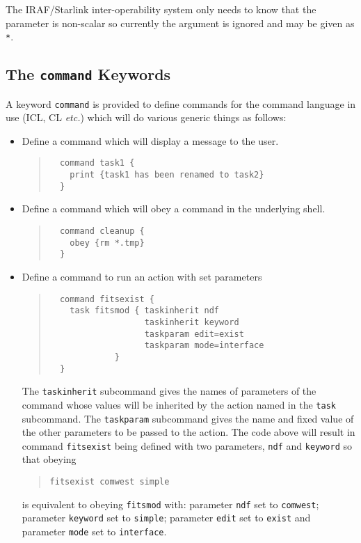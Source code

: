 \documentclass[twoside,11pt]{article}
\newcommand{\htmlref}[2]{#1}
\newcommand{\xlabel}[1]{}
\begin{document}
The IRAF/Starlink inter-operability system only needs to know that the
parameter is non-scalar so currently the argument is ignored and may be given
as \texttt{*}.

\subsection{\xlabel{the_command_keywords}The \texttt{command} Keywords}
A keyword 
\htmlref{\texttt{command}}{command}
is provided to define commands for the command language in use (ICL, CL 
\textit{etc.}) which will do various generic things as follows:
\begin{itemize}
\item Define a command which will display a message to the user.
\begin{quote} \begin{verbatim}
  command task1 {
    print {task1 has been renamed to task2}
  }
\end{verbatim} \end{quote}

\item Define a command which will obey a command in the underlying shell.
\begin{quote} \begin{verbatim}
  command cleanup {
    obey {rm *.tmp}
  }
\end{verbatim} \end{quote}

\item Define a command to run an action with set parameters
\begin{quote} \begin{verbatim}
  command fitsexist {
    task fitsmod { taskinherit ndf
                   taskinherit keyword
                   taskparam edit=exist
                   taskparam mode=interface
             }
  }
\end{verbatim} \end{quote}
The \texttt{taskinherit} subcommand gives the names of parameters of the 
command whose values will be inherited by the action named in the 
\texttt{task} subcommand. 
The \texttt{taskparam} subcommand gives the name and fixed value of the other
parameters to be passed to the action.
The code above will result in command \texttt{fitsexist} being defined with 
two parameters, \texttt{ndf} and \texttt{keyword} so that obeying
\begin{quote} \begin{verbatim}
fitsexist comwest simple
\end{verbatim} \end{quote}
is equivalent to obeying \texttt{fitsmod} with:
parameter \texttt{ndf} set to \texttt{comwest};
parameter \texttt{keyword} set to \texttt{simple};
parameter \texttt{edit} set to \texttt{exist}
and
parameter \texttt{mode} set to \texttt{interface}.


\end{itemize}
\end{document}
